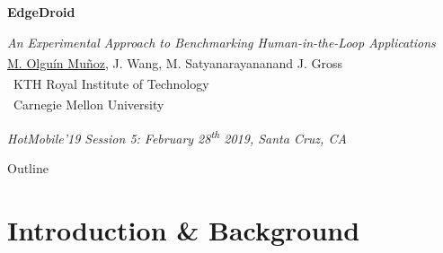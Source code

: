 \documentclass[aspectratio=1610]{beamer}
\newcommand{\kthaffil}{\textsuperscript{\textdagger}}
\newcommand{\cmuaffil}{\textsuperscript{\textdaggerdbl}}
\begin{document}
\startpage
\begin{frame}{}
    \begin{center}
        \begin{LARGE}
            \textbf{EdgeDroid}\\
        \end{LARGE}
        \emph{An Experimental Approach to Benchmarking Human-in-the-Loop Applications}\\
        \vspace{0.02\textheight}
        {\footnotesize \underline{M. Olguín Muñoz}\kthaffil, J. Wang\cmuaffil, M. Satyanarayanan\cmuaffil and J. Gross\kthaffil\\
            \vspace{0.02\textheight}
            \kthaffil~KTH Royal Institute of Technology\\
            \cmuaffil~Carnegie Mellon University\\}
    \end{center}

    \vspace{0.04\textheight}

    \begin{tiny}
        \raggedleft%
        \emph{HotMobile'19 Session 5: February 28\textsuperscript{th} 2019, Santa Cruz, CA}\\
    \end{tiny}
\end{frame}

\normalpage%
\begin{frame}{Outline}
    \tableofcontents[hideallsubsections]
\end{frame}

\section{Introduction \& Background}
\end{document}
